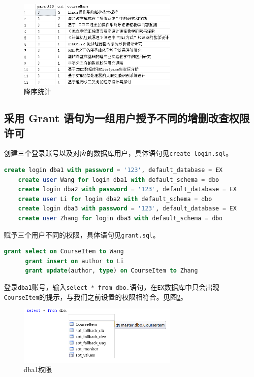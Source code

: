 \documentclass[11pt]{article}
\begin{document}
  \begin{figure}[h]
    \centering
    \includegraphics[width=0.7\textwidth]{desc.png}
    \caption{降序统计}
    \label{fig:desc}
  \end{figure}

  \subsection{采用 Grant 语句为一组用户授予不同的增删改查权限许可}
  创建三个登录账号以及对应的数据库用户，具体语句见\verb|create-login.sql|。
  \begin{file}
    \begin{lstlisting}[language=sql]
    create login dba1 with password = '123', default_database = EX
    create user Wang for login dba1 with default_schema = dbo
    create login dba2 with password = '123', default_database = EX
    create user Li for login dba2 with default_schema = dbo
    create login dba3 with password = '123', default_database = EX
    create user Zhang for login dba3 with default_schema = dbo
    \end{lstlisting}
  \end{file}

  赋予三个用户不同的权限，具体语句见\verb|grant.sql|。
  \begin{file}
    \begin{lstlisting}[language=sql]
      grant select on CourseItem to Wang
      grant insert on author to Li
      grant update(author, type) on CourseItem to Zhang
    \end{lstlisting}
  \end{file}

  登录\verb|dba1|账号，输入\lstinline{select * from dbo.}语句，在\verb|EX|数据库中只会出现\verb|CourseItem|的提示，与我们之前设置的权限相符合。见图\ref{fig:dba1}。

  \begin{figure}[h]
    \centering
    \includegraphics[width=0.7\textwidth]{dba1.png}
    \caption{dba1权限}
    \label{fig:dba1}
  \end{figure}
\end{document}
